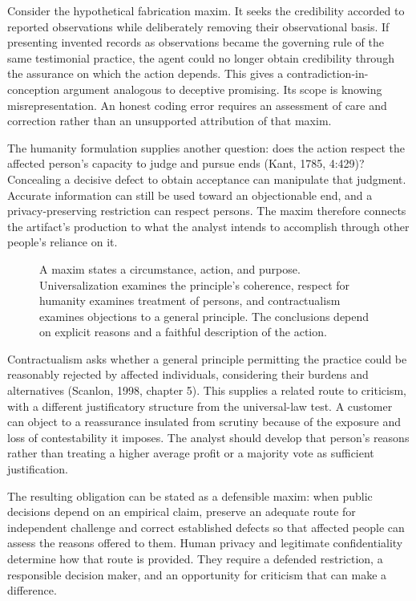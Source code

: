 Consider the hypothetical fabrication maxim. It seeks the credibility
accorded to reported observations while deliberately removing their
observational basis. If presenting invented records as observations
became the governing rule of the same testimonial practice, the agent
could no longer obtain credibility through the assurance on which the
action depends. This gives a contradiction-in-conception argument
analogous to deceptive promising. Its scope is knowing
misrepresentation. An honest coding error requires an assessment of care
and correction rather than an unsupported attribution of that maxim.

The humanity formulation supplies another question: does the action
respect the affected person's capacity to judge and pursue ends (Kant,
1785, 4:429)? Concealing a decisive defect to obtain acceptance can
manipulate that judgment. Accurate information can still be used toward
an objectionable end, and a privacy-preserving restriction can respect
persons. The maxim therefore connects the artifact's production to what
the analyst intends to accomplish through other people's reliance on it.

\begin{figure}[htbp]
\centering

\caption{A maxim states a circumstance, action, and purpose. Universalization examines the principle’s coherence, respect for humanity examines treatment of persons, and contractualism examines objections to a general principle. The conclusions depend on explicit reasons and a faithful description of the action.}\label{fig:M09_maxims_and_data}
\end{figure}

Contractualism asks whether a general principle permitting the practice
could be reasonably rejected by affected individuals, considering their
burdens and alternatives (Scanlon, 1998, chapter 5). This supplies a
related route to criticism, with a different justificatory structure
from the universal-law test. A customer can object to a reassurance
insulated from scrutiny because of the exposure and loss of
contestability it imposes. The analyst should develop that person's
reasons rather than treating a higher average profit or a majority vote
as sufficient justification.

The resulting obligation can be stated as a defensible maxim: when
public decisions depend on an empirical claim, preserve an adequate
route for independent challenge and correct established defects so that
affected people can assess the reasons offered to them. Human privacy
and legitimate confidentiality determine how that route is provided.
They require a defended restriction, a responsible decision maker, and
an opportunity for criticism that can make a difference.

